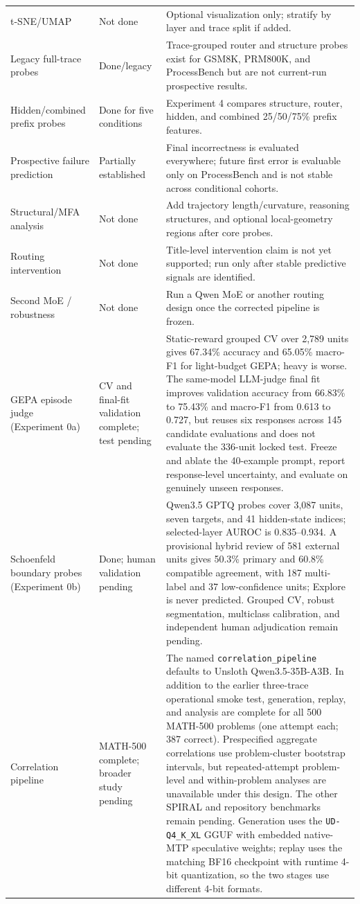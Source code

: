 \documentclass[manuscript,screen,review]{jair}
\begin{document}
\begin{table}[h]
\begin{tabular}{p{}p{}p{}}
t-SNE/UMAP & Not done & Optional visualization only; stratify by layer and trace split if added. \\
Legacy full-trace probes & Done/legacy & Trace-grouped router and structure probes exist for GSM8K, PRM800K, and ProcessBench but are not current-run prospective results. \\
Hidden/combined prefix probes & Done for five conditions & Experiment 4 compares structure, router, hidden, and combined 25/50/75\% prefix features. \\
Prospective failure prediction & Partially established & Final incorrectness is evaluated everywhere; future first error is evaluable only on ProcessBench and is not stable across conditional cohorts. \\
Structural/MFA analysis & Not done & Add trajectory length/curvature, reasoning structures, and optional local-geometry regions after core probes. \\
Routing intervention & Not done & Title-level intervention claim is not yet supported; run only after stable predictive signals are identified. \\
Second MoE / robustness & Not done & Run a Qwen MoE or another routing design once the corrected pipeline is frozen. \\
GEPA episode judge (Experiment 0a) & CV and final-fit validation complete; test pending & Static-reward grouped CV over 2,789 units gives 67.34\% accuracy and 65.05\% macro-F1 for light-budget GEPA; heavy is worse.  The same-model LLM-judge final fit improves validation accuracy from 66.83\% to 75.43\% and macro-F1 from 0.613 to 0.727, but reuses six responses across 145 candidate evaluations and does not evaluate the 336-unit locked test. Freeze and ablate the 40-example prompt, report response-level uncertainty, and evaluate on genuinely unseen responses. \\
Schoenfeld boundary probes (Experiment 0b) & Done; human validation pending & Qwen3.5 GPTQ probes cover 3,087 units, seven targets, and 41 hidden-state indices; selected-layer AUROC is 0.835--0.934.  A provisional hybrid review of 581 external units gives 50.3\% primary and 60.8\% compatible agreement, with 187 multi-label and 37 low-confidence units; Explore is never predicted.  Grouped CV, robust segmentation, multiclass calibration, and independent human adjudication remain pending. \\
Correlation pipeline & MATH-500 complete; broader study pending & The named \texttt{correlation\_pipeline} defaults to Unsloth Qwen3.5-35B-A3B.  In addition to the earlier three-trace operational smoke test, generation, replay, and analysis are complete for all 500 MATH-500 problems (one attempt each; 387 correct).  Prespecified aggregate correlations use problem-cluster bootstrap intervals, but repeated-attempt problem-level and within-problem analyses are unavailable under this design.  The other SPIRAL and repository benchmarks remain pending.  Generation uses the \texttt{UD-Q4\_K\_XL} GGUF with embedded native-MTP speculative weights; replay uses the matching BF16 checkpoint with runtime 4-bit quantization, so the two stages use different 4-bit formats. \\

\end{tabular}
\end{table}
\end{document}
